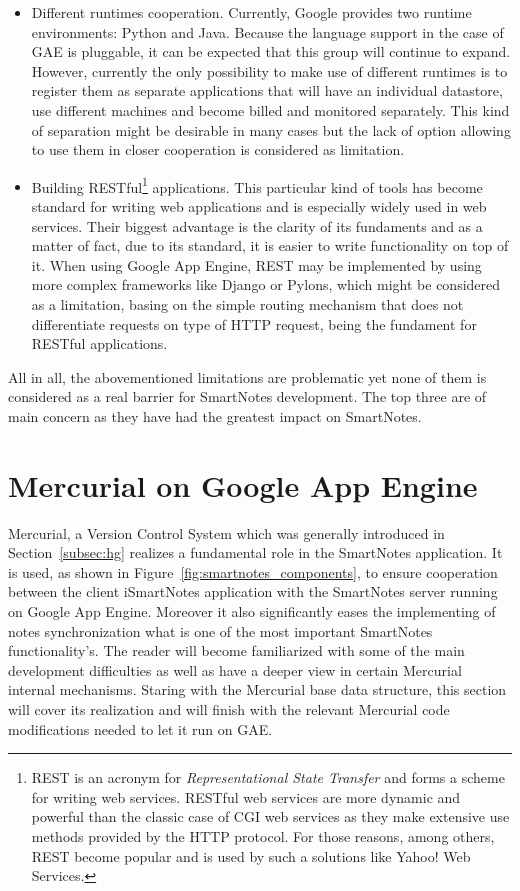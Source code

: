 \begin{itemize}
\item{Different runtimes cooperation. Currently, Google provides two runtime environments: Python and Java. Because the language support in the case of GAE is pluggable, it can be expected that this group will continue to expand. However, currently the only possibility to make use of different runtimes is to register them as separate applications that will have an individual datastore, use different machines and become billed and monitored separately. This kind of separation might be desirable in many cases but the lack of option allowing to use them in closer cooperation is considered as limitation.}
 
\item{Building RESTful\footnote{REST is an acronym for \textit{Representational State Transfer} and forms a scheme for writing web services. RESTful web services are more dynamic and powerful than the classic case of CGI web services as they make extensive use  methods provided by the HTTP protocol. For those reasons, among others, REST become popular and is used by such a solutions like Yahoo! Web Services.} applications. This particular kind of tools has become standard for writing web applications and is especially widely used in web services. Their biggest advantage is the clarity of its fundaments and as a matter of fact, due to its standard, it is easier to write functionality on top of it. When using Google App Engine, REST may be implemented by using more complex frameworks like Django or Pylons, which might be considered as a limitation, basing on the simple routing mechanism that does not differentiate requests on type of HTTP request, being the fundament for RESTful applications.}
\end{itemize}
All in all, the abovementioned limitations are problematic yet none of them is considered as a real barrier for SmartNotes development. The top three are of main concern as they have had the greatest impact on SmartNotes.
 
\section{Mercurial on Google App Engine}\label{sec:hg_on_gae}
Mercurial, a Version Control System which was generally introduced in Section~\ref{subsec:hg} realizes a fundamental role in the SmartNotes application. It is used, as shown in Figure~\ref{fig:smartnotes_components}, to ensure cooperation between the client iSmartNotes application with the SmartNotes server running on Google App Engine. Moreover it also significantly eases the implementing of notes synchronization what is one of the most important SmartNotes functionality's. The reader will become familiarized with some of the main development difficulties as well as have a deeper view in certain Mercurial internal mechanisms. Staring with the Mercurial base data structure, this section will cover its realization and will finish with the relevant Mercurial code modifications needed to let it run on GAE.
 
